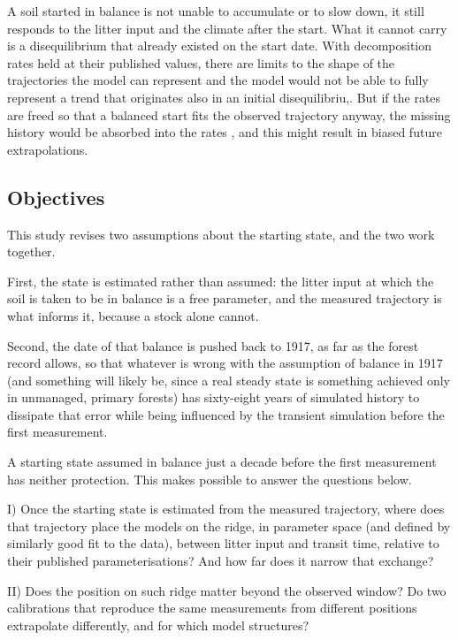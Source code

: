 \documentclass[11pt]{article}
\begin{document}
A soil started in balance is not unable to accumulate or to slow down, it still responds to
 the litter input and the climate after the start. What it cannot carry is a
disequilibrium that already existed on the start date. With decomposition rates held at their
published values, there are limits to the shape of the trajectories the model can represent and the model would not be able to fully represent a trend that originates also in an initial disequilibriu,. But if the rates are freed so that a balanced start fits the
observed trajectory anyway, the missing history would be absorbed into the rates
\citep{Wutzler2007}, and this might result in biased future extrapolations.

\subsection{Objectives}

This study revises two assumptions about the starting state, and the two work together. 

First,
the state is estimated rather than assumed: the litter input at which the soil is taken
to be in balance is a free parameter, and the measured trajectory is what informs it,
because a stock alone cannot. 

Second, the date of that balance is pushed back to 1917,
as far as the forest record allows, so that whatever is wrong with the assumption of
balance in 1917 (and something will likely be, since a real steady state is something achieved only in unmanaged, primary forests) has sixty-eight years of simulated history to dissipate that error while being influenced by the transient simulation before the first
measurement. 

A starting
state assumed in balance just a decade before the first measurement has neither protection.
This makes possible to answer the questions below.

I) Once the
starting state is estimated from the measured trajectory, where does that trajectory
place the models on the ridge, in parameter space (and defined by similarly good fit to the data), between litter input and transit time, relative to
their published parameterisations? And how far does it narrow that exchange?

II) Does the position on such ridge matter beyond the observed
window? Do two calibrations that reproduce the same measurements from different
positions extrapolate differently, and for which model structures? 
\end{document}
